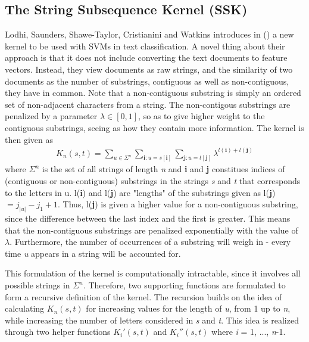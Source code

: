 \documentclass{article}
\begin{document}
\subsection{The String Subsequence Kernel (SSK)}

Lodhi, Saunders, Shawe-Taylor, Cristianini and Watkins introduces in (\cite{Lodhi2002}) a new kernel to be used with SVMs in text classification. A novel thing about their approach is that it does not include converting the text documents to feature vectors. Instead, they view documents as raw strings, and the similarity of two documents as the number of substrings, contiguous as well as non-contiguous, they have in common. Note that a non-contiguous substring is simply an ordered set of non-adjacent characters from a string. The non-contigous substrings are penalized by a parameter $\lambda \in [0,1]$, so as to give higher weight to the contiguous substrings, seeing as how they contain more information. The kernel is then given as
\begin{gather*}
    K_n(s,t) = \sum_{u \in \Sigma^n} \sum_{\textbf{i}:u=s[\textbf{i}]} \sum_{\textbf{j}:u=t[\textbf{j}]} \lambda^{l(\textbf{i}) + l(\textbf{j})}
\end{gather*}
where $\Sigma^n$ is the set of all strings of length \textit{n} and \textbf{i} and \textbf{j} constitues indices of (contiguous or non-contiguous) substrings in the strings \textit{s} and \textit{t} that corresponds to the letters in u. l(\textbf{i}) and l(\textbf{j}) are "lengths" of the substrings given as l(\textbf{j})$ = j_{|u|} - j_1 + 1$. Thus, l(\textbf{j}) is given a higher value for a non-contiguous substring, since the difference between the last index and the first is greater. This means that the non-contiguous substrings are penalized exponentially with the value of $\lambda$. Furthermore, the number of occurrences of a substring will weigh in - every time \textit{u} appears in a string will be accounted for.
\par

This formulation of the kernel is computationally intractable, since it involves all possible strings in $\Sigma^n$. Therefore, two supporting functions are formulated to form a recursive definition of the kernel. The recursion builds on the idea of calculating $K_n(s,t)$ for increasing values for the length of \textit{u}, from 1 up to \textit{n}, while increasing the number of letters considered in \textit{s} and \textit{t}. This idea is realized through two helper functions $K_i'(s,t)$ and $K_i''(s,t)$ where \textit{i} = 1, ..., \textit{n}-1.
\end{document}
